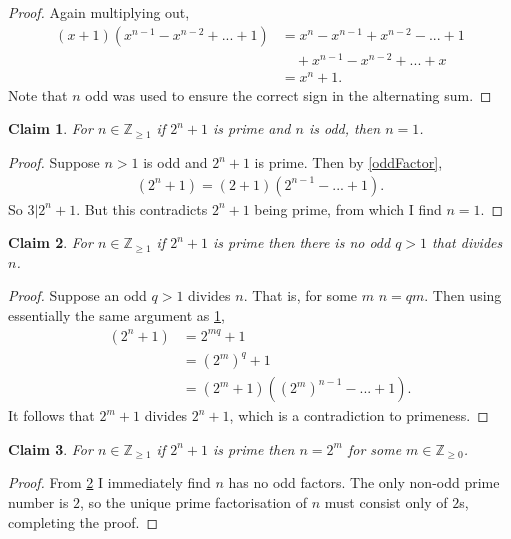 \documentclass{article}
\newcommand{\zp}{\mathbb{Z}_{\geq 1}}
\newcommand{\znn}{\mathbb{Z}_{\geq 0}}
\newtheorem{claim}{Claim}
\begin{document}
  \begin{proof}
    Again multiplying out, 
    \begin{align*}
      (x + 1)(x^{n - 1} - x^{n - 2} + ... + 1) &= x^n - x^{n - 1} + x^{n - 2} - ... + 1 \\
                                              &\quad + x^{n - 1} - x^{n - 2} + ... + x \\
                                              &= x^n + 1.
    \end{align*}
    Note that $n$ odd was used to ensure the correct sign in the alternating sum.
  \end{proof}
  \begin{claim}\label{twoN}
    For $n \in \zp$ if $2^n + 1$ is prime and $n$ is odd, then $n = 1$.
  \end{claim}
  \begin{proof}
    Suppose $n > 1$ is odd and $2^n + 1$ is prime. Then by \cref{oddFactor},
    \begin{align*}
      (2^n + 1) = (2 + 1)(2^{n - 1} - ... + 1).
    \end{align*}
    So $3 | 2^n + 1$. But this contradicts $2^n + 1$ being prime, from which I find
    $n = 1$.
  \end{proof}
  \begin{claim}\label{notDivByOdd}
    For $n \in \zp$ if $2^n + 1$ is prime then there is no odd $q > 1$ that divides $n$.
  \end{claim}
  \begin{proof} 
    Suppose an odd $q > 1$ divides $n$. That is, for some $m$ $n = qm$. Then using essentially the same argument as
    \cref{twoN},
    \begin{align*}
      (2^n + 1) &= 2^{mq} + 1 \\
                &= \left( 2^{m} \right)^q + 1 \\
                &= (2^m + 1)((2^m)^{n - 1} - ... + 1).
    \end{align*}
    It follows that $2^m + 1$ divides $2^n + 1$, which is a contradiction to primeness.
  \end{proof}
  \begin{claim}
    For $n \in \zp$ if $2^n + 1$ is prime then $n = 2^m$ for some $m \in \znn$.
  \end{claim}
  \begin{proof}
    From \cref{notDivByOdd} I immediately find $n$ has no odd factors. The only non-odd
    prime number is $2$, so the unique prime factorisation of $n$ must consist only of $2$s, completing the proof.
  \end{proof}
\end{document}
